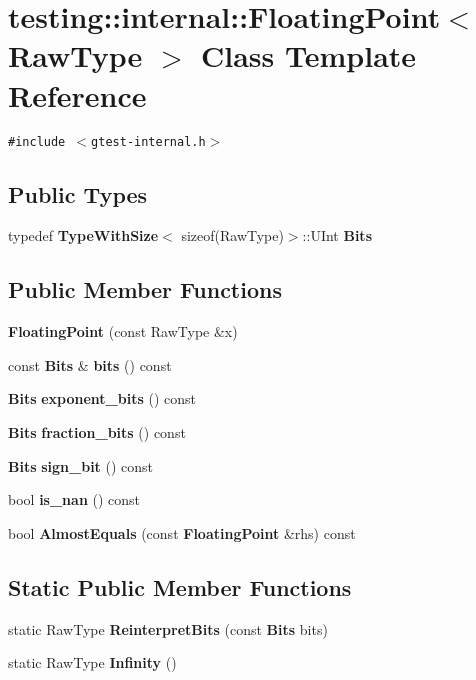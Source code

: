 \section{testing::internal::FloatingPoint$<$ RawType $>$ Class Template Reference}
\label{classtesting_1_1internal_1_1FloatingPoint}
{\tt \#include $<$gtest-internal.h$>$}

\subsection*{Public Types}
\begin{CompactItemize}
\item 
typedef {\bf TypeWithSize}$<$ sizeof(RawType)$>$::UInt {\bf Bits}
\end{CompactItemize}
\subsection*{Public Member Functions}
\begin{CompactItemize}
\item 
{\bf FloatingPoint} (const RawType \&x)
\item 
const {\bf Bits} \& {\bf bits} () const
\item 
{\bf Bits} {\bf exponent\_\-bits} () const
\item 
{\bf Bits} {\bf fraction\_\-bits} () const
\item 
{\bf Bits} {\bf sign\_\-bit} () const
\item 
bool {\bf is\_\-nan} () const
\item 
bool {\bf AlmostEquals} (const {\bf FloatingPoint} \&rhs) const 
\end{CompactItemize}
\subsection*{Static Public Member Functions}
\begin{CompactItemize}
\item 
static RawType {\bf ReinterpretBits} (const {\bf Bits} bits)
\item 
static RawType {\bf Infinity} ()
\end{CompactItemize}
